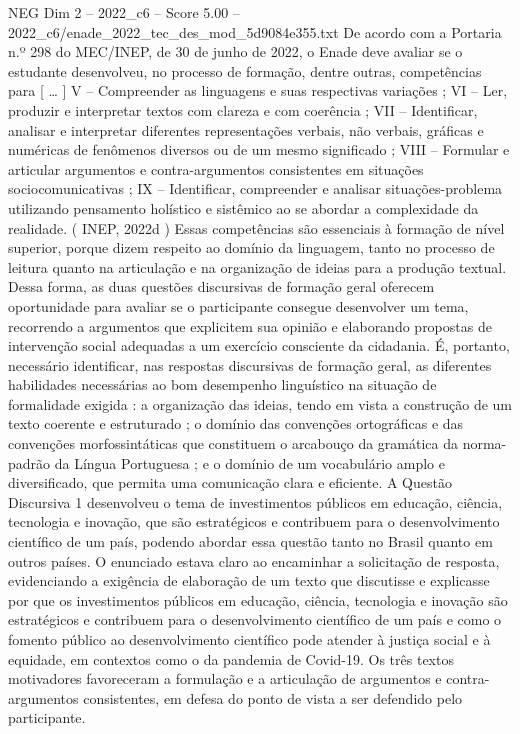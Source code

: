 \begin{textsample}{NEG Dim 2 – 2022\_c6 – Score 5.00 – 2022\_c6/enade\_2022\_tec\_des\_mod\_5d9084e355.txt}
De acordo com a Portaria n.º 298 do MEC/INEP, de 30 de junho de 2022, o Enade deve avaliar se o estudante desenvolveu, no processo de formação, dentre outras, competências para [ … ] V – Compreender as linguagens e suas respectivas variações ; VI – Ler, produzir e interpretar textos com clareza e com coerência ; VII – Identificar, analisar e interpretar diferentes representações verbais, não verbais, gráficas e numéricas de fenômenos diversos ou de um mesmo significado ; VIII – Formular e articular argumentos e contra-argumentos consistentes em situações sociocomunicativas ; IX – Identificar, compreender e analisar situações-problema utilizando pensamento holístico e sistêmico ao se abordar a complexidade da realidade. ( INEP, 2022d ) Essas competências são essenciais à formação de nível superior, porque dizem respeito ao domínio da linguagem, tanto no processo de leitura quanto na articulação e na organização de ideias para a produção textual.
Dessa forma, as duas questões discursivas de formação geral oferecem oportunidade para avaliar se o participante consegue desenvolver um tema, recorrendo a argumentos que explicitem sua opinião e elaborando propostas de intervenção social adequadas a um exercício consciente da cidadania.
É, portanto, necessário identificar, nas respostas discursivas de formação geral, as diferentes habilidades necessárias ao bom desempenho linguístico na situação de formalidade exigida : a organização das ideias, tendo em vista a construção de um texto coerente e estruturado ; o domínio das convenções ortográficas e das convenções morfossintáticas que constituem o arcabouço da gramática da norma-padrão da Língua Portuguesa ; e o domínio de um vocabulário amplo e diversificado, que permita uma comunicação clara e eficiente.
A Questão Discursiva 1 desenvolveu o tema de investimentos públicos em educação, ciência, tecnologia e inovação, que são estratégicos e contribuem para o desenvolvimento científico de um país, podendo abordar essa questão tanto no Brasil quanto em outros países.
O enunciado estava claro ao encaminhar a solicitação de resposta, evidenciando a exigência de elaboração de um texto que discutisse e explicasse por que os investimentos públicos em educação, ciência, tecnologia e inovação são estratégicos e contribuem para o desenvolvimento científico de um país e como o fomento público ao desenvolvimento científico pode atender à justiça social e à equidade, em contextos como o da pandemia de Covid-19.
Os três textos motivadores favoreceram a formulação e a articulação de argumentos e contra-argumentos consistentes, em defesa do ponto de vista a ser defendido pelo participante.

\end{textsample}

